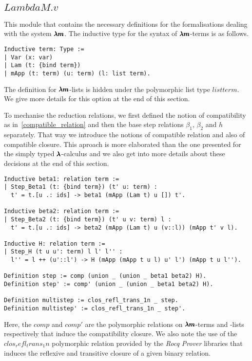 \subsection{\lst$LambdaM.v$}

This module that contains the necessary definitions for the formalisations dealing with the system $\pmb{\lambda m}$.
The inductive type for the syntax of $\pmb{\lambda m}$-terms is as follows.
\begin{lstlisting}[language=Coq]
Inductive term: Type :=
| Var (x: var)
| Lam (t: {bind term})
| mApp (t: term) (u: term) (l: list term).
\end{lstlisting}

The definition for $\pmb{\lambda m}$-lists is hidden under the polymorphic list type \lst$list term$.
We give more details for this option at the end of this section.

To mechanise the reduction relations, we first defined the notion of compatibility as in~\cref{compatible_relation} and then the base step relations $\beta_1$, $\beta_2$ and $h$ separately.
That way we introduce the notions of compatible relation and also of compatible closure.
This aproach is more elaborated than the one presented for the simply typed $\pmb{\lambda}$-calculus and we also get into more details about these decisions at the end of this section.

\begin{lstlisting}[language=Coq]
Inductive beta1: relation term :=
| Step_Beta1 (t: {bind term}) (t' u: term) :
  t' = t.[u .: ids] -> beta1 (mApp (Lam t) u []) t'.

Inductive beta2: relation term :=
| Step_Beta2 (t: {bind term}) (t' u v: term) l :
  t' = t.[u .: ids] -> beta2 (mApp (Lam t) u (v::l)) (mApp t' v l).

Inductive H: relation term :=       
| Step_H (t u u': term) l l' l'' :
  l'' = l ++ (u'::l') -> H (mApp (mApp t u l) u' l') (mApp t u l'').

Definition step := comp (union _ (union _ beta1 beta2) H).
Definition step' := comp' (union _ (union _ beta1 beta2) H).

Definition multistep := clos_refl_trans_1n _ step.
Definition multistep' := clos_refl_trans_1n _ step'.
\end{lstlisting}

Here, the \lst$comp$ and \lst$comp'$ are the polymorphic relations on $\pmb{\lambda m}$-terms and -lists respectively that induce the compatibility closure.
We also note the use of the \lst$clos_refl_trans_1n$ polymorphic relation provided by the \textit{Rocq Prover} libraries that induces the reflexive and transitive closure of a given binary relation.

